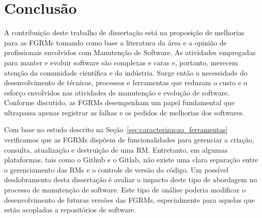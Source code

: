 \chapter{Conclusão}\label{ch:conclusao_trab_futuros}

A contribuição deste trabalho de dissertação está na proposição de melhorias
para as FGRMs tomando como base a literatura da área e a opinião de
profissionais envolvidos com Manutenção de Software. As atividades empregadas
para manter e evoluir software são complexas e caras e, portanto, merecem
atenção da comunidade científica e da indústria. Surge então a necessidade do
desenvolvimento de técnicas, processos e ferramentas que reduzam o custo e o
esforço envolvidos nas atividades de manutenção e evolução de software.
Conforme discutido, as FGRMs desempenham um papel fundamental que ultrapassa
apenas registrar as falhas e os pedidos de melhorias dos softwares.

Com base no estudo descrito na Seção~\ref{sec:caracterizacao_ferramentas}
verificamos que as FGRMs dispõem de funcionalidades para gerenciar a criação,
consulta, atualização e destruição de uma RM\@. Entretanto, em algumas
plataformas, tais como o Github e o Gitlab, não existe uma clara separação
entre o gerenciamento das RMs e o controle de versão do código. Um possível
desdobramento desta dissertação é avaliar o impacto deste tipo de abordagem no
processo de manutenção de software. Este tipo de análise poderia modificar o
desenvolvimento de futuras versões das FGRMs, especialmente para aquelas que
estão acopladas a repositórios de software.

